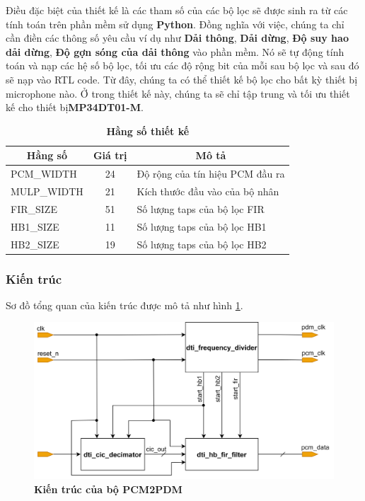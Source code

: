 Điều đặc biệt của thiết kế là các tham số của các bộ lọc sẽ được sinh ra từ các tính toán trên phần mềm sử dụng \textbf{Python}. Đồng nghĩa với việc, chúng ta chỉ cần điền các thông số yêu cầu ví dụ như \textbf{Dải thông}, \textbf{Dải dừng}, \textbf{Độ suy hao dải dừng}, \textbf{Độ gợn sóng của dải thông} vào phần mềm. Nó sẽ tự động tính toán và nạp các hệ số bộ lọc, tối ưu các độ rộng bit của mỗi sau bộ lọc và sau đó sẽ nạp vào RTL code. Từ đây, chúng ta có thể thiết kế bộ lọc cho bất kỳ thiết bị microphone nào. Ở trong thiết kế này, chúng ta sẽ chỉ tập trung và tối ưu thiết kế cho thiết bị\textbf{MP34DT01-M}.


\begin{table}[H]
    \centering
    \caption[Hằng số thiết kế]{\bfseries\fontsize{12pt}{0pt}\selectfont Hằng số thiết kế}
\begin{tabular}{|l|c|l|}
\hline
\multicolumn{1}{|c|}{\textbf{Hằng số}} & \textbf{Giá trị} & \multicolumn{1}{c|}{\textbf{Mô tả}} \\ \hline
PCM\_WIDTH  & 24 & Độ rộng của tín hiệu PCM đầu ra \\ \hline
MULP\_WIDTH & 21 & Kích thước đầu vào của bộ nhân  \\ \hline
FIR\_SIZE   & 51 & Số lượng taps của bộ lọc FIR    \\ \hline
HB1\_SIZE   & 11 & Số lượng taps của bộ lọc HB1    \\ \hline
HB2\_SIZE   & 19 & Số lượng taps của bộ lọc HB2    \\ \hline
\end{tabular}
    \label{hangso}
\end{table}
\subsubsection{Kiến trúc}
Sơ đồ tổng quan của kiến trúc được mô tả như hình \ref{arc_top}.
\begin{figure}[H]
    \centering
    \includegraphics[width=12cm]{Images/Chuong4/arc_top.png}
    \caption[Kiến trúc của bộ PCM2PDM]{\bfseries \fontsize{12pt}{0pt}\selectfont Kiến trúc của bộ PCM2PDM}
    \label{arc_top}
\end{figure}

